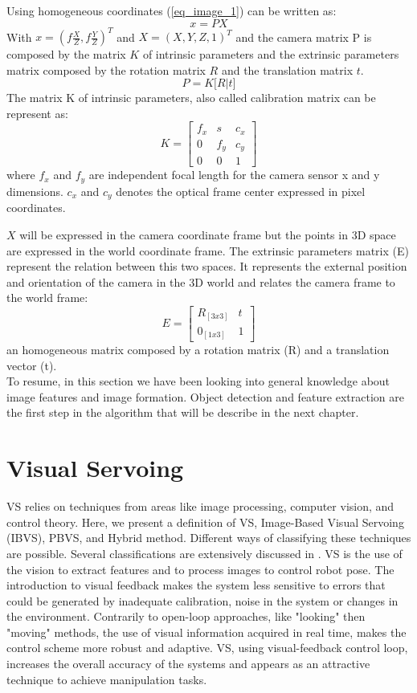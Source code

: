Using homogeneous coordinates (\ref{eq_image_1}) can be written as:
\begin{equation}
   x = PX
\end{equation}
With $ x = (f \frac{X}{Z},f \frac{Y}{Z})^T $ and $ X = (X, Y, Z, 1)^T$ and the camera matrix P is composed by the matrix $K$ of intrinsic parameters and the extrinsic parameters matrix composed by the rotation matrix $R$ and the translation matrix $t$.
\begin{equation}
   P = K \big[ R|t \big]
\end{equation}
The matrix K of intrinsic parameters, also called calibration matrix can be represent as:
\[
K 
=
\begin{bmatrix}
    f_{x} & s & c_{x} \\
    0 & f_{y} & c_{y}\\
    0 & 0 & 1
\end{bmatrix}
\]
where $f_{x}$ and $f_{y}$ are independent focal length for the camera sensor x and y dimensions. $c_{x}$ and $c_{y}$ denotes the optical frame center expressed in pixel coordinates.

$X$ will be expressed in the camera coordinate frame but the points in 3D space are expressed in the world coordinate frame. The extrinsic parameters matrix (E)  represent the relation between this two spaces. It represents the external position and orientation of the camera in the 3D world and relates the camera frame to the world frame:
\[
E
=
\begin{bmatrix}
    R_{[3x3]} & t \\
    0_{[1x3]} & 1
\end{bmatrix}
\]
an homogeneous matrix composed by a rotation matrix (R) and a translation vector (t).\\

To resume, in this section we have been looking into general knowledge about image features and image formation. Object detection and feature extraction are the first step in the algorithm that will be describe in the next chapter.
\newpage
\section{Visual Servoing}
\label{Visual_Servoing}

\gls{VS} relies on techniques from areas like image processing, computer vision, and
control theory. Here, we present a definition of VS, Image-Based Visual Servoing (IBVS), \gls{PBVS}, and Hybrid method. Different ways of classifying these techniques are possible. Several classifications are extensively discussed in \cite{Staniak:2010:SVS:1831760.1831963}.
VS is the use of the vision to extract features and to process images to control robot pose. The introduction to visual feedback makes the system less sensitive to errors that could be generated by inadequate calibration, noise in the system or changes in the environment. Contrarily to open-loop approaches, like "looking" then "moving" methods, the use of visual information acquired in real time, makes the control scheme more robust and adaptive. VS, using visual-feedback control loop, increases the overall accuracy of the systems and appears as an attractive technique to achieve manipulation tasks.

